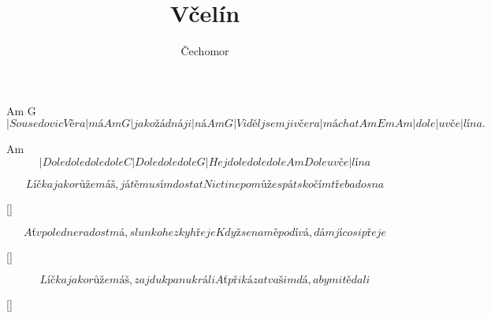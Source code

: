 \documentclass{song}
\title{Včelín}
\author{Čechomor}
\begin{document}
\strophe
   Am               G
\[ |Sousedovic Věra |má
Am            G
|jako žádná ji|ná
Am                   G
|Viděl jsem ji včera |máchat
Am    Em    Am
|dole |u vče|lína. \]
\endstrophe

   Am
\[ |Dole dole dole dole
C
|Dole dole dole
G
|Hej dole dole dole
          Am
Dole u vče|lína \]
\endstrophe

\strophe*
\[ Líčka jako růže máš,
já tě musím dostat
Nic ti nepomůže spát
skočím třeba do sna \]
\endstrophe

\ref{}

\strophe*
\[ Ať v poledne radost má,
slunko hezky hřeje
Když se na mě podívá,
dám jí co si přeje \]
\endstrophe

\ref{}

\strophe*
\[ Líčka jako růže máš,
zajdu k panu králi
Ať přikázat vašim dá,
aby mi tě dali \]
\endstrophe

\ref{}
\end{document}
